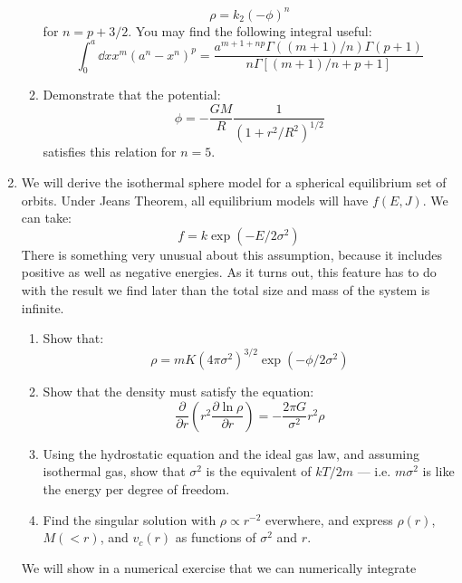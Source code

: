 \begin{enumerate}
\begin{enumerate}
\begin{equation}
\rho = k_2 \left(-\phi\right)^n
\end{equation}
for $n=p+3/2$. You may find the following integral useful:
\begin{equation}
\int_0^a {\dd x} x^m \left(a^n - x^n\right)^p =
\frac{a^{m+1+np} \Gamma\left((m+1)/n\right) \Gamma\left(p+1\right)}
{n \Gamma\left[(m+1)/n +p + 1\right]}
\end{equation}
\item Demonstrate that the potential:
\begin{equation}
\phi = - \frac{GM}{R} \frac{1}{\left(1 + r^2/R^2\right)^{1/2}}
\end{equation}
satisfies this relation for $n=5$. 
\end{enumerate}
\item We will derive the isothermal sphere model for a spherical
equilibrium set of orbits. Under Jeans Theorem, all equilibrium models
will have $f(E,J)$.  We can take:
\begin{equation}
f = 
k \exp\left(-E/2\sigma^2\right)
\end{equation}
There is something very unusual about this assumption, because it
includes positive as well as negative energies. As it turns out, this
feature has to do with the result we find later than the total size
and mass of the system is infinite. 
\begin{enumerate}
\item Show that:
\begin{equation}
\rho = m K \left(4\pi\sigma^2\right)^{3/2} \exp\left(-\phi/2 \sigma^2\right)
\end{equation}
\item Show that the density must satisfy the equation:
\begin{equation}
\frac{\partial}{\partial
r} \left(r^2 \frac{\partial \ln \rho}{\partial r} \right) =
- \frac{2\pi G}{\sigma^2} r^2 \rho
\end{equation}
\item Using the hydrostatic equation and the ideal gas law, and
assuming isothermal gas, show that $\sigma^2$ is the equivalent of
$kT/2m$ --- i.e. $m\sigma^2$ is like the energy per degree of freedom.
\item Find the singular solution with $\rho\propto r^{-2}$ everwhere,
and express $\rho(r)$, $M(<r)$, and $v_c(r)$ as functions of
$\sigma^2$ and $r$.
\end{enumerate}
We will show in a  numerical exercise that we can numerically integrate

\end{enumerate}
